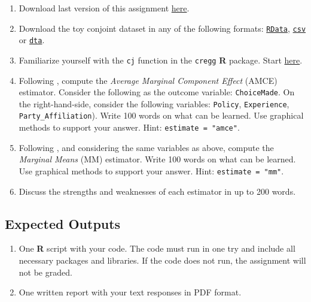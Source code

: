 \documentclass[10pt]{article}
\begin{document}
\begin{enumerate}
  \item  Download last version of this assignment \href{https://github.com/hbahamonde/Exp_Soc_Science/raw/main/Lectures/Labs/Conjoint/Conjoint_Lab.pdf}{{\color{red}here}}.%

  \item Download the toy conjoint dataset in any of the following formats: \href{https://github.com/hbahamonde/Exp_Soc_Science/raw/main/Lectures/Labs/Conjoint/Conjoint_Data.RData}{\texttt{RData}}, \href{https://raw.githubusercontent.com/hbahamonde/Exp_Soc_Science/main/Lectures/Labs/Conjoint/Conjoint_Data.csv}{\texttt{csv}} or \href{https://github.com/hbahamonde/Exp_Soc_Science/raw/main/Lectures/Labs/Conjoint/Conjoint_Data.dta}{\texttt{dta}}.
  \item Familiarize yourself with the \texttt{cj} function in the \texttt{cregg} {\bf R} package. Start \href{https://thomasleeper.com/cregg/reference/cregg.html}{here}.
  \item Following \textcite{Hainmueller2014}, compute the 
  \emph{Average Marginal Component Effect} (AMCE) estimator. Consider the following as the outcome variable: \texttt{ChoiceMade}. On the right-hand-side, consider the following variables: \texttt{Policy}, \texttt{Experience},  \texttt{Party\_Affiliation}). Write 100 words on what can be learned. Use graphical methods to support your answer. Hint: \texttt{estimate = "amce"}.
  
  \item Following \textcite{Leeper2020a}, and considering the same variables as above, compute 
  the \emph{Marginal Means} (MM) estimator. Write 100 words on what can be learned. Use graphical methods to support your answer. Hint: \texttt{estimate = "mm"}.
  \item Discuss the strengths and weaknesses of each estimator in up to 200 words.
\end{enumerate}


\subsection*{Expected Outputs}

\begin{enumerate}
  \item One {\bf R} script with your code. The code must run in one try and include all necessary packages and libraries. If the code does not run, the assignment will not be graded. 

  \item One written report with your text responses in PDF format.
\end{enumerate}



\newpage
\printbibliography
\end{document}
